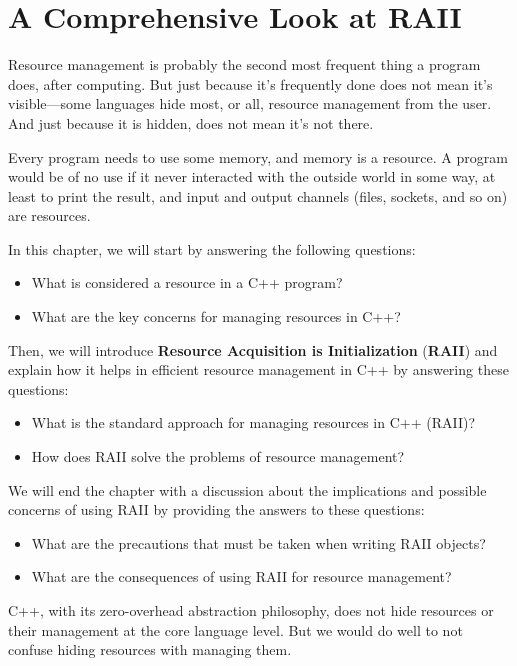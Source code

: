 ﻿\chapter{A Comprehensive Look at RAII}

Resource management is probably the second most frequent thing a program does, after computing. But just because it's frequently done does not mean it's visible---some languages hide most, or all, resource management from the user. And just because it is hidden, does not mean it's not there.

Every program needs to use some memory, and memory is a resource. A program would be of no use if it never interacted with the outside world in some way, at least to print the result, and input and output channels (files, sockets, and so on) are resources.

In this chapter, we will start by answering the following questions:

\begin{itemize}
\item
  What is considered a resource in a C++ program?
\item
  What are the key concerns for managing resources in C++?
\end{itemize}

Then, we will introduce \textbf{Resource Acquisition is Initialization} (\textbf{RAII}) and explain how it helps in efficient resource management in C++ by answering these questions:

\begin{itemize}
\item
  What is the standard approach for managing resources in C++ (RAII)?
\item
  How does RAII solve the problems of resource management?
\end{itemize}

We will end the chapter with a discussion about the implications and possible concerns of using RAII by providing the answers to these questions:

\begin{itemize}
\item
  What are the precautions that must be taken when writing RAII objects?
\item
  What are the consequences of using RAII for resource management?
\end{itemize}

C++, with its zero-overhead abstraction philosophy, does not hide resources or their management at the core language level. But we would do well to not confuse hiding resources with managing them.

